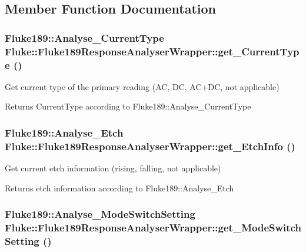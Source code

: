 \subsection{Member Function Documentation}
\hypertarget{classFluke_1_1Fluke189ResponseAnalyserWrapper_a31b55c6b5400156efc8040a3f4b7437d}{
\subsubsection[{get\_\-CurrentType}]{\setlength{\rightskip}{0pt plus 5cm}Fluke189::Analyse\_\-CurrentType Fluke::Fluke189ResponseAnalyserWrapper::get\_\-CurrentType ()}}
\label{classFluke_1_1Fluke189ResponseAnalyserWrapper_a31b55c6b5400156efc8040a3f4b7437d}
Get current type of the primary reading (AC, DC, AC+DC, not applicable) \begin{DoxyReturn}{Returns}
CurrentType according to Fluke189::Analyse\_\-CurrentType 
\end{DoxyReturn}
\hypertarget{classFluke_1_1Fluke189ResponseAnalyserWrapper_af78476c14cae1c2be2f3ee370e28efca}{
\subsubsection[{get\_\-EtchInfo}]{\setlength{\rightskip}{0pt plus 5cm}Fluke189::Analyse\_\-Etch Fluke::Fluke189ResponseAnalyserWrapper::get\_\-EtchInfo ()}}
\label{classFluke_1_1Fluke189ResponseAnalyserWrapper_af78476c14cae1c2be2f3ee370e28efca}
Get current etch information (rising, falling, not applicable) \begin{DoxyReturn}{Returns}
etch information according to Fluke189::Analyse\_\-Etch 
\end{DoxyReturn}
\hypertarget{classFluke_1_1Fluke189ResponseAnalyserWrapper_ab9c2c45e6a6b8b2d0b89c8c5bab0c110}{
\subsubsection[{get\_\-ModeSwitchSetting}]{\setlength{\rightskip}{0pt plus 5cm}Fluke189::Analyse\_\-ModeSwitchSetting Fluke::Fluke189ResponseAnalyserWrapper::get\_\-ModeSwitchSetting ()}}
